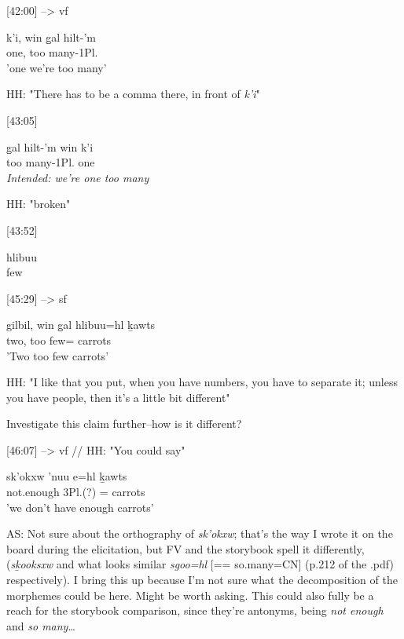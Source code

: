 [42:00] --> vf
\begin{exe}
\ex \gll k'i, win g̱al hilt-'m\\
one, \Comp{} too many-1Pl.\Iii{}\\
'one we're too many'
\end{exe}

HH: "There has to be a comma there, in front of \textit{k'i}"

[43:05]
\begin{exe}
\ex \gll * g̱al hilt-'m win k'i\\
{} too many-1Pl.\Iii{} \Comp{} one\\
\textit{Intended: we're one too many}
\end{exe}

HH: "broken"

[43:52]
\begin{exe}
\ex \gll hlibuu\\
few\\
\end{exe}

[45:29] --> sf
\begin{exe}
\ex \gll gilbil, win g̱al hlibuu=hl ḵawts\\
two, \Comp{} too few=\Cn{} carrots\\
'Two too few carrots'
\end{exe}

HH: "I like that you put, when you have numbers, you have to separate it; unless you have people, then it's a little bit different"

Investigate this claim further--how is it different?

[46:07] --> vf // HH: "You could say"
\begin{exe}
\ex \gll sk'okxw 'nuu e=hl ḵawts\\
not.enough 3Pl.\Iii{}(?) \Prep{}=\Cn{} carrots\\
'we don't have enough carrots'
\end{exe}

AS: Not sure about the orthography of \textit{sk'okxw}; that's the way I wrote it on the board during the elicitation, but FV and the storybook spell it differently, (\textit{sḵooksxw} and what looks similar \textit{sgoo=hl} [== so.many=CN] (p.212 of the .pdf) respectively). I bring this up because I'm not sure what the decomposition of the morphemes could be here. Might be worth asking.
This could also fully be a reach for the storybook comparison, since they're antonyms, being \textit{not enough} and \textit{so many}\dots

